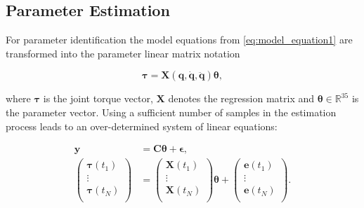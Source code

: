 
\subsection{Parameter Estimation}
\label{subsec:ParameterEstimation}


For parameter identification the model equations from \eqref{eq:model_equation1} are transformed into the parameter linear matrix notation

\begin{equation} \label{eq:ParameterEstimation_regressor}
    \boldsymbol{\tau} = \boldsymbol{X}(\boldsymbol{q}, \dot{\boldsymbol{q}},\ddot{\boldsymbol{q}}) \boldsymbol{\theta},
\end{equation}

where $\boldsymbol{\tau}$ is the joint torque vector, $\boldsymbol{X}$ denotes the regression matrix and $\boldsymbol{\theta} \in \mathbb{R}^{35}$ is the parameter vector. Using a sufficient number of samples in the estimation process leads to an over-determined system of linear equations:

\begin{equation} \label{eq:ParameterEstimation_problem}
\begin{aligned}
    \boldsymbol{y} &= \boldsymbol{C} \boldsymbol{\theta} + \boldsymbol{\epsilon}, \\
    \begin{pmatrix}
        \boldsymbol{\tau}(t_1) \\
        \vdots \\
        \boldsymbol{\tau}(t_N) \\
    \end{pmatrix} &= 
    \begin{pmatrix}
        \boldsymbol{X}(t_1) \\
        \vdots \\
        \boldsymbol{X}(t_N) \\
    \end{pmatrix} \boldsymbol{\theta} +
    \begin{pmatrix}
        \boldsymbol{e}(t_1) \\
        \vdots \\
        \boldsymbol{e}(t_N) \\
    \end{pmatrix}.
\end{aligned}
\end{equation}

